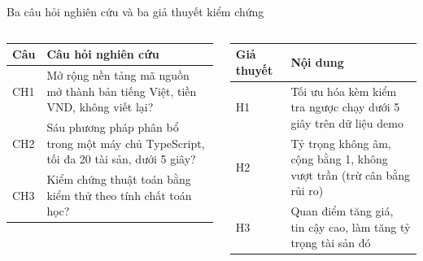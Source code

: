 \documentclass[aspectratio=169,10pt]{beamer}
\begin{document}
\begin{frame}[t]{Ba câu hỏi nghiên cứu và ba giả thuyết kiểm chứng}
  \begin{columns}[T]
    \begin{column}{0.48\textwidth}
      \begin{tabular}{@{}L{1.0cm}L{4.9cm}@{}}
        \toprule
        \textbf{Câu} & \textbf{Câu hỏi nghiên cứu} \\
        \midrule
        CH1 & Mở rộng nền tảng mã nguồn mở thành bản tiếng Việt, tiền VND, không viết lại? \\
        CH2 & Sáu phương pháp phân bổ trong một máy chủ TypeScript, tối đa 20 tài sản, dưới 5 giây? \\
        CH3 & Kiểm chứng thuật toán bằng kiểm thử theo tính chất toán học? \\
        \bottomrule
      \end{tabular}
    \end{column}
    \begin{column}{0.48\textwidth}
      \begin{tabular}{@{}L{1.6cm}L{4.4cm}@{}}
        \toprule
        \textbf{Giả thuyết} & \textbf{Nội dung} \\
        \midrule
        H1 & Tối ưu hóa kèm kiểm tra ngược chạy dưới 5 giây trên dữ liệu demo \\
        H2 & Tỷ trọng không âm, cộng bằng 1, không vượt trần (trừ cân bằng rủi ro) \\
        H3 & Quan điểm tăng giá, tin cậy cao, làm tăng tỷ trọng tài sản đó \\
        \bottomrule
      \end{tabular}
    \end{column}
  \end{columns}
\end{frame}
\end{document}
